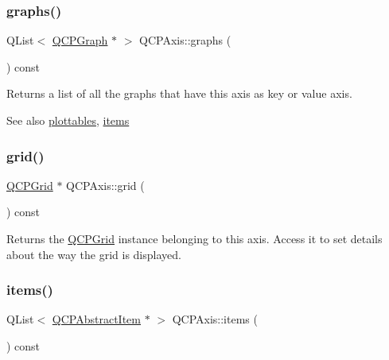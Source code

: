 \mbox{\label{class_q_c_p_axis_ad590c0da223697a2727f97a520870fec}} 
\subsubsection{\texorpdfstring{graphs()}{graphs()}}
{\footnotesize\ttfamily Q\+List$<$ \mbox{\hyperlink{class_q_c_p_graph}{Q\+C\+P\+Graph}} $\ast$ $>$ Q\+C\+P\+Axis\+::graphs (\begin{DoxyParamCaption}{ }\end{DoxyParamCaption}) const}

Returns a list of all the graphs that have this axis as key or value axis.

\begin{DoxySeeAlso}{See also}
\mbox{\hyperlink{class_q_c_p_axis_ac5e0f6f65c75efb5fd32275d6e4ef0d6}{plottables}}, \mbox{\hyperlink{class_q_c_p_axis_a42761bc68e2f3a9f68549d45b73f705b}{items}} 
\end{DoxySeeAlso}
\mbox{\label{class_q_c_p_axis_a63f1dd2df663680d2a8d06c19592dd63}} 
\subsubsection{\texorpdfstring{grid()}{grid()}}
{\footnotesize\ttfamily \mbox{\hyperlink{class_q_c_p_grid}{Q\+C\+P\+Grid}} $\ast$ Q\+C\+P\+Axis\+::grid (\begin{DoxyParamCaption}{ }\end{DoxyParamCaption}) const\hspace{0.3cm}{\ttfamily [inline]}}

Returns the \mbox{\hyperlink{class_q_c_p_grid}{Q\+C\+P\+Grid}} instance belonging to this axis. Access it to set details about the way the grid is displayed. \mbox{\label{class_q_c_p_axis_a42761bc68e2f3a9f68549d45b73f705b}} 
\subsubsection{\texorpdfstring{items()}{items()}}
{\footnotesize\ttfamily Q\+List$<$ \mbox{\hyperlink{class_q_c_p_abstract_item}{Q\+C\+P\+Abstract\+Item}} $\ast$ $>$ Q\+C\+P\+Axis\+::items (\begin{DoxyParamCaption}{ }\end{DoxyParamCaption}) const}

